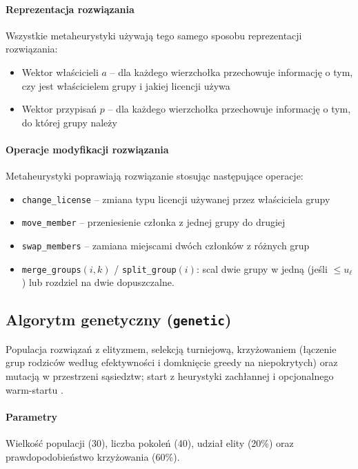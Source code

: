 \paragraph{Reprezentacja rozwiązania}
Wszystkie metaheurystyki używają tego samego sposobu reprezentacji rozwiązania:
\begin{itemize}
  \item Wektor właścicieli $a$ -- dla każdego wierzchołka przechowuje informację o tym, czy jest właścicielem grupy i jakiej licencji używa
  \item Wektor przypisań $p$ -- dla każdego wierzchołka przechowuje informację o tym, do której grupy należy
\end{itemize}

\paragraph{Operacje modyfikacji rozwiązania}
Metaheurystyki poprawiają rozwiązanie stosując następujące operacje:
\begin{itemize}
  \item \texttt{change\_license} -- zmiana typu licencji używanej przez właściciela grupy
  \item \texttt{move\_member} -- przeniesienie członka z jednej grupy do drugiej
  \item \texttt{swap\_members} -- zamiana miejscami dwóch członków z różnych grup
  \item \texttt{merge\_groups}$(i,k)$ / \texttt{split\_group}$(i)$: scal dwie grupy w jedną (jeśli $\le u_\ell$) lub rozdziel na dwie dopuszczalne.
\end{itemize}

\subsection{Algorytm genetyczny (\texttt{genetic})}\label{subsec:ga}
Populacja rozwiązań z elityzmem, selekcją turniejową, krzyżowaniem (łączenie grup rodziców według efektywności i domknięcie greedy na niepokrytych) oraz mutacją w przestrzeni sąsiedztw; start z heurystyki zachłannej i opcjonalnego warm-startu \cite{holland1975,goldberg1989}.

\paragraph{Parametry}
Wielkość populacji (30), liczba pokoleń (40), udział elity (20\%) oraz prawdopodobieństwo krzyżowania (60\%).

